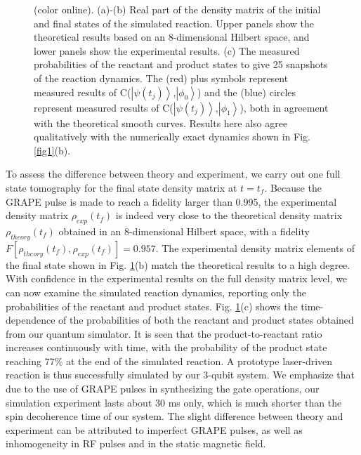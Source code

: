 \documentclass[twocolumn,showpacs,twoside,10pt,prl]{revtex4}
\begin{document}
\begin{figure}[htb]
\setlength{\abovecaptionskip}{-0.35cm}
\caption{\footnotesize{(color online). (a)-(b) Real part of the density matrix of the initial and final states of the simulated reaction.
Upper panels show the theoretical results based on an 8-dimensional Hilbert space, and lower panels show the experimental results.
(c) The measured probabilities of the reactant and product states to give 25 snapshots of the reaction dynamics.   The (red) plus symbols represent measured results of C($\left\vert \psi(t_j)\right\rangle$,$\left\vert \phi_{0} \right\rangle$) and the (blue) circles represent measured results of C($\left\vert \psi(t_j) \right\rangle$,$\left\vert \phi_{1} \right\rangle$), both in agreement with the theoretical smooth curves.  Results here also agree qualitatively
with the numerically exact dynamics shown in Fig. \ref{fig1}(b).}}\label{tomo}
\end{figure}

 To assess the difference between theory and experiment,  we carry out one full state tomography for the final state density matrix  at $t=t_f$.
 Because the GRAPE pulse is made to reach a fidelity larger than 0.995, the experimental density matrix $\rho_{exp}(t_f)$
 is indeed very close to the  theoretical density matrix $\rho_{theory}(t_f)$ obtained in an 8-dimensional Hilbert space, with a fidelity $F[\rho_{theory}(t_f),\rho_{exp}(t_f)]=0.957$. The experimental density matrix elements of the final state shown in Fig. \ref{tomo}(b) match the theoretical results to a high degree. With confidence in the experimental results on the full density matrix level, we can now examine the simulated reaction dynamics, reporting only the probabilities of the reactant and product states.
 Fig. \ref{tomo}(c) shows the time-dependence of the probabilities of both the reactant and product states obtained from our quantum simulator.
 It is seen that the product-to-reactant ratio
  increases continuously with time, with the probability of the product state reaching 77\% at the end of the simulated reaction.
    A prototype laser-driven reaction is thus successfully simulated by our 3-qubit system.
    We emphasize that due to the use of GRAPE pulses in synthesizing the gate operations, our simulation experiment lasts about 30 ms only, which is much shorter than the spin decoherence time of our system.
  The slight difference between theory and experiment can be attributed to imperfect GRAPE pulses, as well as inhomogeneity in RF pulses and in the static magnetic field.

\end{document}

